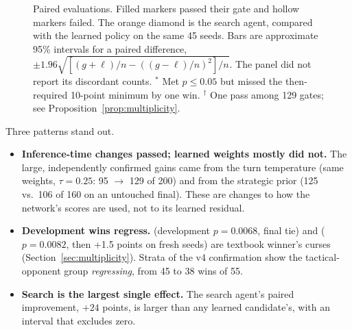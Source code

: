 \begin{figure}[htbp]
\caption{Paired evaluations. Filled markers passed their gate and hollow
markers failed. The orange diamond is the search agent, compared with the
learned policy on the same 45 seeds. Bars are approximate 95\% intervals for a
paired difference, $\pm1.96\sqrt{[(g+\ell)/n-((g-\ell)/n)^2]/n}$. The
 panel did not report its discordant counts. $^*$ Met $p\le0.05$
but missed the then-required 10-point minimum by one win. $^\dag$ One pass
among 129 gates; see Proposition~\ref{prop:multiplicity}.}
\label{fig:forest}
\end{figure}

Three patterns stand out.
\begin{itemize}
  \item \textbf{Inference-time changes passed; learned weights mostly did not.}
    The large, independently confirmed gains came from the turn temperature
    (same weights, $\tau=0.25$: 95 $\to$ 129 of 200) and from the strategic
    prior (125 vs.\ 106 of 160 on an untouched final). These are changes to
    how the network's scores are used, not to its learned residual.
  \item \textbf{Development wins regress.}  (development
    $p=0.0068$, final tie) and  ($p=0.0082$, then +1.5
    points on fresh seeds) are textbook winner's curses
    (Section~\ref{sec:multiplicity}). Strata of the v4 confirmation show the
    tactical-opponent group \emph{regressing}, from 45 to 38 wins of 55.
  \item \textbf{Search is the largest single effect.} The search agent's paired
    improvement, $+24$ points, is larger than any learned candidate's, with an
    interval that excludes zero.
\end{itemize}


